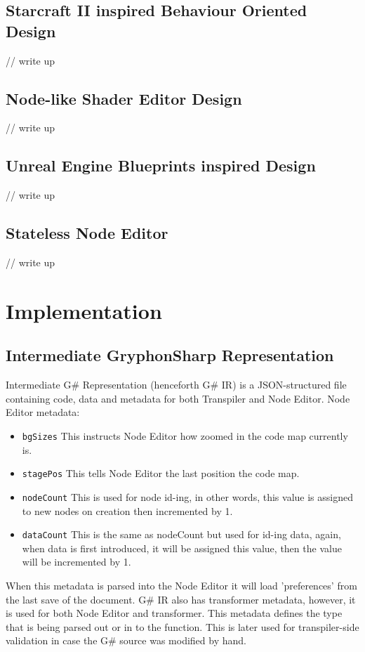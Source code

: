 \documentclass{article}
\begin{document}
\subsection{Starcraft II inspired Behaviour Oriented Design}
\citep*{d2857949266349429ebd6e5db6c1d3a3}
// write up
\subsection{Node-like Shader Editor Design}
\citep{kiper_1997_criteria, coronado_2020_visual}
// write up
\subsection{Unreal Engine Blueprints inspired Design}
// write up
\subsection{Stateless Node Editor}
\citep*{8120404}
// write up




\section{Implementation}
\subsection{Intermediate GryphonSharp Representation}
Intermediate G\# Representation (henceforth G\# IR) is a JSON-structured file containing code, data and metadata for both Transpiler and Node Editor.
Node Editor metadata: 
\begin{itemize}
    \item \lstinline[columns=fixed]{bgSizes} \newline
    This instructs Node Editor how zoomed in the code map currently is.
    \item \lstinline[columns=fixed]{stagePos} \newline
    This tells Node Editor the last position the code map.
    \item \lstinline[columns=fixed]{nodeCount} \newline
    This is used for node id-ing, in other words, this value is assigned to new nodes on creation then incremented by 1.
    \item \lstinline[columns=fixed]{dataCount} \newline
    This is the same as nodeCount but used for id-ing data, again, when data is first introduced, it will be assigned this value, then the value will be incremented by 1.
\end{itemize}
When this metadata is parsed into the Node Editor it will load 'preferences' from the last save of the document.
G\# IR also has transformer metadata, however, it is used for both Node Editor and transformer. This metadata defines the type that is being parsed out or in to the function. This is later used for transpiler-side validation in case the G\# source was modified by hand.
\end{document}
